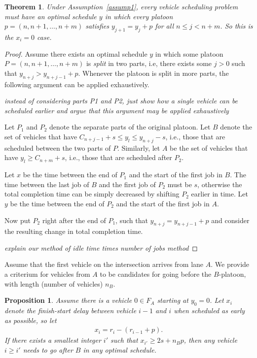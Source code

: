 \documentclass{article}
\theoremstyle{definition}
\theoremstyle{plain}
\newtheorem{proposition}{Proposition}[section]
\newtheorem{theorem}{Theorem}[section]
\begin{document}
\begin{theorem}
  Under Assumption~\ref{assump1}, every vehicle scheduling problem must have an
  optimal schedule $y$ in which every platoon $p=(n, n+1, \dots, n+m)$ satisfies
  $y_{j+1} = y_{j} + p$ for all $n \leq j < n + m$.
  \textit{\color{blue}So this is the $x_i=0$ case.}
\end{theorem}
\begin{proof}
  Assume there exists an optimal schedule $y$ in which some platoon
  $P=(n, n+1, \dots, n+m)$ is \textit{split} in two parts, i.e, there exists
  some $j > 0$ such that $y_{n+j} > y_{n+j-1} + p$. Whenever the platoon is
  split in more parts, the following argument can be applied exhaustively.

  \textit{\color{blue}instead of considering parts P1 and P2, just show how a
    single vehicle can be scheduled earlier and argue that this argument may be
    applied exhaustively}

  Let $P_{1}$ and $P_{2}$ denote the separate parts of the original platoon. Let
  $B$ denote the set of vehicles that have
  $C_{n+j-1} + s \leq y_{l} \leq y_{n+j} - s$, i.e., those that are scheduled
  between the two parts of $P$. Similarly, let $A$ be the set of vehicles that
  have $y_{l} \geq C_{n+m} + s$, i.e., those that are scheduled after $P_{2}$.

  Let $x$ be the time between the end of $P_{1}$ and the start of the first job
  in $B$. The time between the last job of $B$ and the first job of $P_{2}$ must
  be $s$, otherwise the total completion time can be simply decreased by
  shifting $P_{2}$ earlier in time. Let $y$ be the time between the end of
  $P_{2}$ and the start of the first job in $A$.

  Now put $P_{2}$ right after the end of $P_{1}$, such that
  $y_{n+j} = y_{n+j-1} + p$ and consider the resulting change in total
  completion time.

  \textit{\color{blue}explain our method of idle time times number of jobs method}
\end{proof}

Assume that the first vehicle on the intersection arrives from lane $A$.
We provide a criterium for vehicles from $A$ to be candidates for going before the $B$-platoon, with length (number of vehicles) $n_{B}$.

\begin{proposition}
  Assume there is a vehicle $0 \in F_{A}$ starting at $y_{0} = 0$. Let $x_{i}$
  denote the finish-start delay between vehicle $i-1$ and $i$ when scheduled as
  early as possible, so let
  \begin{align*}
    x_{i} = r_{i} - (r_{i-1} + p) .
  \end{align*}
  If there exists a smallest integer $i'$ such that $x_{i'} \geq 2s + n_{B}p$,
  then any vehicle $i \geq i'$ needs to go after $B$ in any optimal schedule.
\end{proposition}
\end{document}
